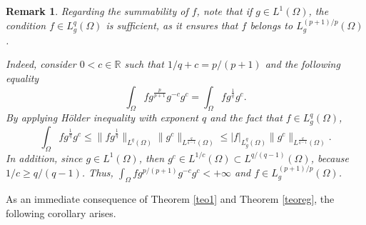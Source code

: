 \documentclass[preprint,12pt]{elsarticle}
\newtheorem{remark}[theorem]{Remark}
\begin{document}
		\begin{remark}\label{summabilityintegralg}
			Regarding the summability of $f$, note that if ${g\in L^1(\Omega)}$, the condition $f\in L^q_g(\Omega)$ is sufficient, as it ensures that $f$ belongs to $L^{(p+1)/p}_g(\Omega)$. \par
			Indeed, consider $0<c\in \mathbb{R}$ such that $1/q+c=p/(p+1)$ and the following equality 
			\[\int_{\Omega}f g^{\frac{p}{p+1}}g^{-c}g^{c}=\int_{\Omega}f g^{\frac{1}{q}}g^{c}.\]	
			By applying H\"older inequality with exponent $q$ and the fact that $f\in L^{q}_g(\Omega)$,
			\[\int_{\Omega}f g^{\frac{1}{q}}g^{c}\leq \|f g^{\frac{1}{q}}\|_{L^q(\Omega)}\|g^c\|_{L^{\frac{q}{q-1}}(\Omega)} \leq |f|_{L^{q}_g(\Omega)} \|g^c\|_{L^{\frac{q}{q-1}}(\Omega)}.\]	
			In addition, since $g\in L^1(\Omega)$, then $g^c\in L^{1/c}(\Omega)\subset L^{q/(q-1)}(\Omega)$, because $1/c\geq q/(q-1)$. Thus, $\int_{\Omega}f g^{p/(p+1)}g^{-c}g^{c}<+\infty$ and $f\in L^{(p+1)/p}_g(\Omega)$.
			
		\end{remark}
		
		As an immediate consequence of Theorem \ref{teo1} and Theorem \ref{teoreg}, the following corollary arises.
		
		
		
\end{document}
